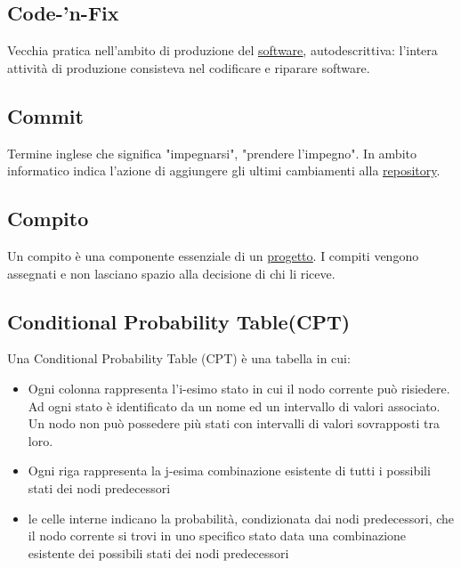 	\subsection{Code-'n-Fix}
	\label{sec:codenfix}
	Vecchia pratica nell'ambito di produzione del \underline{\hyperref[sec:prodottosoftware]{software}}, autodescrittiva: l'intera attività di produzione consisteva nel codificare e riparare software.

	\subsection{Commit}
	\label{sec:commit}
    Termine inglese che significa "impegnarsi", "prendere l'impegno". In ambito informatico indica l'azione di aggiungere gli ultimi cambiamenti alla \underline{\hyperref[sec:repo]repository{}}.

	\subsection{Compito}
	\label{sec:compiti}
	Un compito è una componente essenziale di un \underline{\hyperref[sec:progetto]{progetto}}. I compiti vengono assegnati e non lasciano spazio alla decisione di chi li riceve.

	\subsection{Conditional Probability Table(CPT)}
	\label{sec:CPT}
	Una Conditional Probability Table (CPT) è una tabella in cui:
		\begin{itemize}
			\item{Ogni colonna rappresenta l'i-esimo stato in cui il nodo corrente può risiedere. Ad ogni stato è identificato da un nome ed un intervallo di valori associato. Un nodo non può possedere più stati con intervalli di valori sovrapposti tra loro.}
			\item{Ogni riga rappresenta la j-esima combinazione esistente di tutti i possibili stati dei nodi predecessori}
			\item{le celle interne indicano la probabilità, condizionata dai nodi predecessori, che il nodo corrente si trovi in uno specifico stato data una combinazione esistente dei possibili stati dei nodi predecessori}
		\end{itemize}

